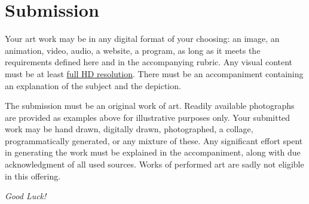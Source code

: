 \documentclass[addpoints]{exam}
\begin{document}
\section*{Submission}

Your art work may be in any digital format of your choosing: an image, an animation, video, audio, a website, a program, as long as it meets the requirements defined here and in the accompanying rubric. Any visual content must be at least \href{https://dsplay.tv/site/en/suporte/qual-a-diferenca-entre-resolucoes-hd-full-hd-ultra-hd-2k-4k-8k-10k/}{full HD resolution}. There must be an accompaniment containing an explanation of the subject and the depiction.

The submission must be an original work of art. Readily available photographs are provided as examples above for illustrative purposes only. Your submitted work may be hand drawn, digitally drawn, photographed, a collage, programmatically generated, or any mixture of these. Any significant effort spent in generating the work must be explained in the accompaniment, along with due acknowledgment of all used sources. Works of performed art are sadly not eligible in this offering.

\bigskip

\hrulefill \textit{Good Luck!} \hrulefill
\end{document}
